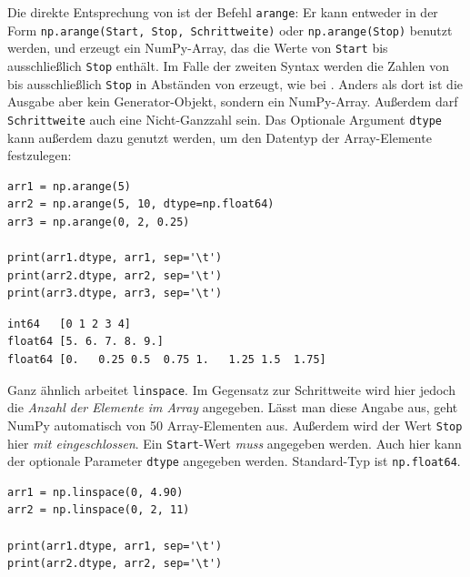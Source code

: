 Die direkte Entsprechung von  ist der Befehl \texttt{arange}: Er kann entweder in der Form \texttt{np.arange(Start, Stop, Schrittweite)} oder \texttt{np.arange(Stop)} benutzt werden, und erzeugt ein NumPy-Array, das die Werte von \texttt{Start} bis ausschließlich \texttt{Stop} enthält. Im Falle der zweiten Syntax werden die Zahlen von  bis ausschließlich \texttt{Stop} in Abständen von  erzeugt, wie bei . Anders als dort ist die Ausgabe aber kein Generator-Objekt, sondern ein NumPy-Array. Außerdem darf \texttt{Schrittweite} auch eine Nicht-Ganzzahl sein. Das Optionale Argument \texttt{dtype} kann außerdem dazu genutzt werden, um den Datentyp der Array-Elemente festzulegen:

\begin{codebox}
\begin{verbatim}
arr1 = np.arange(5)
arr2 = np.arange(5, 10, dtype=np.float64)
arr3 = np.arange(0, 2, 0.25)

print(arr1.dtype, arr1, sep='\t')
print(arr2.dtype, arr2, sep='\t')
print(arr3.dtype, arr3, sep='\t')
\end{verbatim}
\end{codebox}

\begin{cmdbox}
\begin{verbatim}
int64   [0 1 2 3 4]
float64 [5. 6. 7. 8. 9.]
float64 [0.   0.25 0.5  0.75 1.   1.25 1.5  1.75]
\end{verbatim}
\end{cmdbox}

Ganz ähnlich arbeitet \texttt{linspace}. Im Gegensatz zur Schrittweite wird hier jedoch die \emph{Anzahl der Elemente im Array} angegeben. Lässt man diese Angabe aus, geht NumPy automatisch von 50 Array-Elementen aus. Außerdem wird der Wert \texttt{Stop} hier \emph{mit eingeschlossen}. Ein \texttt{Start}-Wert \emph{muss} angegeben werden. Auch hier kann der optionale Parameter \texttt{dtype} angegeben werden. Standard-Typ ist \texttt{np.float64}.

\begin{codebox}
\begin{verbatim}
arr1 = np.linspace(0, 4.90)
arr2 = np.linspace(0, 2, 11)

print(arr1.dtype, arr1, sep='\t')
print(arr2.dtype, arr2, sep='\t')
\end{verbatim}
\end{codebox}

